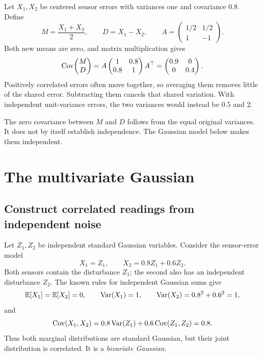 \begin{example}
Let \(X_1,X_2\) be centered sensor errors with variances one and
covariance \(0.8\). Define
\[
  M=\frac{X_1+X_2}{2},\qquad D=X_1-X_2,\qquad
  A=\begin{pmatrix}1/2&1/2\\1&-1\end{pmatrix}.
\]
Both new means are zero, and matrix multiplication gives
\[
  \operatorname{Cov}\!\begin{pmatrix}M\\D\end{pmatrix}
  =A\begin{pmatrix}1&0.8\\0.8&1\end{pmatrix}A^\top
  =\begin{pmatrix}0.9&0\\0&0.4\end{pmatrix}.
\]
Positively correlated errors often move together, so averaging them
removes little of the shared error. Subtracting them cancels that
shared variation. With independent unit-variance errors, the two
variances would instead be \(0.5\) and \(2\).
\end{example}

The zero covariance between \(M\) and \(D\) follows from the equal
original variances. It does not by itself establish independence. The
Gaussian model below makes them independent.

\section{The multivariate Gaussian}
\label{sec:multivariate-gaussian}

\subsection{Construct correlated readings from independent noise}

Let \(Z_1,Z_2\) be independent standard Gaussian variables. Consider
the sensor-error model
\[
  X_1=Z_1,\qquad X_2=0.8Z_1+0.6Z_2.
\]
Both sensors contain the disturbance \(Z_1\); the second also has an
independent disturbance \(Z_2\). The known rules for independent
Gaussian sums give
\[
  \mathbb{E}[X_1]=\mathbb{E}[X_2]=0,\qquad
  \operatorname{Var}(X_1)=1,\qquad \operatorname{Var}(X_2)=0.8^2+0.6^2=1,
\]
and
\[
  \operatorname{Cov}(X_1,X_2)=0.8\operatorname{Var}(Z_1)+0.6\operatorname{Cov}(Z_1,Z_2)=0.8.
\]
Thus both marginal distributions are standard Gaussian, but their
joint distribution is correlated. It is a \emph{bivariate Gaussian}.

